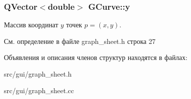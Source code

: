\subsubsection[{\texorpdfstring{y}{y}}]{\setlength{\rightskip}{0pt plus 5cm}Q\+Vector$<$double$>$ G\+Curve\+::y}\hypertarget{struct_g_curve_a40d381ce3d5ea2ccf654b9e35a8f594b}{}\label{struct_g_curve_a40d381ce3d5ea2ccf654b9e35a8f594b}
Массив координат $y$ точек $p = (x,y)$. 

См. определение в файле graph\+\_\+sheet.\+h строка 27



Объявления и описания членов структур находятся в файлах\+:\begin{DoxyCompactItemize}
\item 
src/gui/graph\+\_\+sheet.\+h\item 
src/gui/graph\+\_\+sheet.\+cc\end{DoxyCompactItemize}
